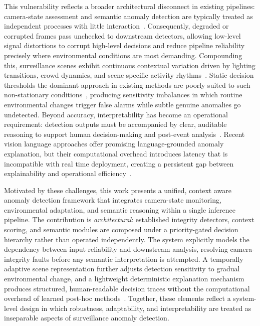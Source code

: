 \documentclass[a4paper,fleqn]{cas-dc}
\begin{document}
This vulnerability reflects a broader architectural disconnect in existing pipelines: camera-state assessment and semantic anomaly detection are typically treated as independent processes with little interaction~\citep{sultani2018realworld,zhong2019graph}. Consequently, degraded or corrupted frames pass unchecked to downstream detectors, allowing low-level signal distortions to corrupt high-level decisions and reduce pipeline reliability precisely where environmental conditions are most demanding. Compounding this, surveillance scenes exhibit continuous contextual variation driven by lighting transitions, crowd dynamics, and scene specific activity rhythms~\citep{ristea2024selfdistill,ionescu2019object}. Static decision thresholds the dominant approach in existing methods are poorly suited to such non-stationary conditions~\citep{lv2024unbiased,feng2021mist}, producing sensitivity imbalances in which routine environmental changes trigger false alarms while subtle genuine anomalies go undetected. Beyond accuracy, interpretability has become an operational requirement: detection outputs must be accompanied by clear, auditable reasoning to support human decision-making and post-event analysis~\citep{yang2024textvad,wu2024vadclip,wu2020not}. Recent vision language approaches offer promising language-grounded anomaly explanation, but their computational overhead introduces latency that is incompatible with real time deployment, creating a persistent gap between explainability and operational efficiency~\citep{zanella2024harnessing}.
 
Motivated by these challenges, this work presents a unified, context aware anomaly detection framework that integrates camera-state monitoring, environmental adaptation, and semantic reasoning within a single inference pipeline. The contribution is \emph{architectural}: established integrity detectors, context scoring, and semantic modules are composed under a priority-gated decision hierarchy rather than operated independently. The system explicitly models the dependency between input reliability and downstream analysis, resolving camera-integrity faults before any semantic interpretation is attempted. A temporally adaptive scene representation further adjusts detection sensitivity to gradual environmental change, and a lightweight deterministic explanation mechanism produces structured, human-readable decision traces without the computational overhead of learned post-hoc methods~\citep{aboah2023vision}. Together, these elements reflect a system-level design in which robustness, adaptability, and interpretability are treated as inseparable aspects of surveillance anomaly detection.
 
\end{document}
